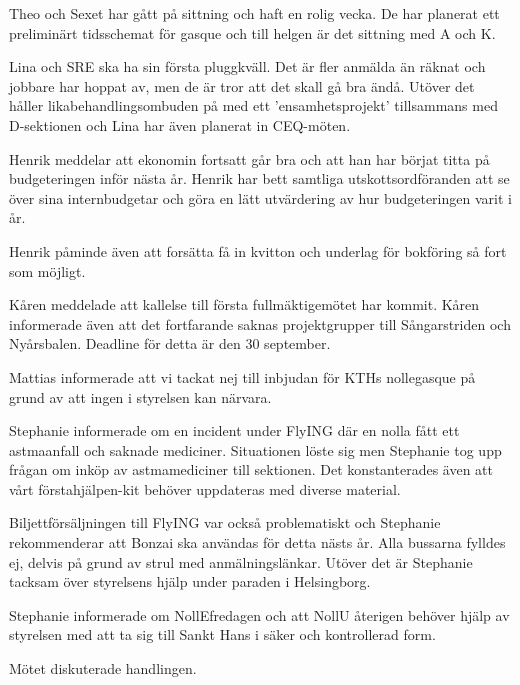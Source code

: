 \documentclass[10pt]{article}
\begin{document}
\begin{paragrafer}
\begin{paragrafer}
Theo och Sexet har gått på sittning och haft en rolig vecka. De har planerat ett preliminärt tidsschemat för gasque och till helgen är det sittning med A och K. 

Lina och SRE ska ha sin första pluggkväll. Det är fler anmälda än räknat och jobbare har hoppat av, men de är tror att det skall gå bra ändå. Utöver det håller likabehandlingsombuden på med ett 'ensamhetsprojekt' tillsammans med D-sektionen och Lina har även planerat in CEQ-möten. 


Henrik meddelar att ekonomin fortsatt går bra och att han har börjat titta på budgeteringen inför nästa år. Henrik har bett samtliga utskottsordföranden att se över sina internbudgetar och göra en lätt utvärdering av hur budgeteringen varit i år. 

Henrik påminde även att forsätta få in kvitton och underlag för bokföring så fort som möjligt. 


Kåren meddelade att kallelse till första fullmäktigemötet har kommit. Kåren informerade även att det fortfarande saknas projektgrupper till Sångarstriden och Nyårsbalen. Deadline för detta är den 30 september. 

Mattias informerade att vi tackat nej till inbjudan för KTHs nollegasque på grund av att ingen i styrelsen kan närvara. 

\end{paragrafer}


Stephanie informerade om en incident under FlyING där en nolla fått ett astmaanfall och saknade mediciner. Situationen löste sig men Stephanie tog upp frågan om inköp av astmamediciner till sektionen. Det konstanterades även att vårt förstahjälpen-kit behöver uppdateras med diverse material. 
 
Biljettförsäljningen till FlyING var också problematiskt och Stephanie rekommenderar att Bonzai ska användas för detta nästs år. Alla bussarna fylldes ej, delvis på grund av strul med anmälningslänkar. Utöver det är Stephanie tacksam över styrelsens hjälp under paraden i Helsingborg. 

Stephanie informerade om NollEfredagen och att NollU återigen behöver hjälp av styrelsen med att ta sig till Sankt Hans i säker och kontrollerad form.

Mötet diskuterade handlingen.


\end{paragrafer}
\end{document}

